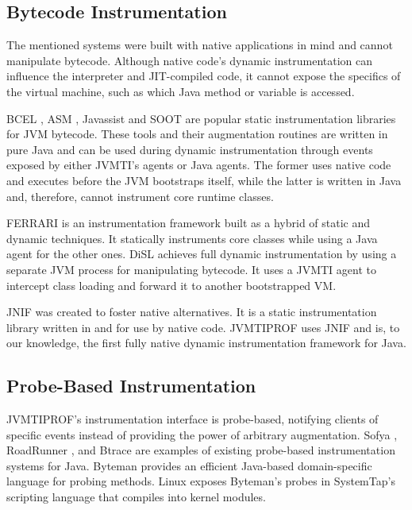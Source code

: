 \subsection{Bytecode Instrumentation}

The mentioned systems were built with native applications in mind and cannot manipulate bytecode. Although native code's dynamic instrumentation can influence the interpreter and JIT-compiled code, it cannot expose the specifics of the virtual machine, such as which Java method or variable is accessed.

BCEL \cite{dahm1999bcel}, ASM \cite{bruneton2002asm}, Javassist \cite{chiba2003javassist} and SOOT \cite{vallee2010soot} are popular static instrumentation libraries for JVM bytecode. These tools and their augmentation routines are written in pure Java and can be used during dynamic instrumentation through events exposed by either JVMTI's agents or Java agents. The former uses native code and executes before the JVM bootstraps itself, while the latter is written in Java and, therefore, cannot instrument core runtime classes.

FERRARI \cite{binder2007ferrari} is an instrumentation framework built as a hybrid of static and dynamic techniques. It statically instruments core classes while using a Java agent for the other ones. DiSL \cite{marek2012disl} achieves full dynamic instrumentation by using a separate JVM process for manipulating bytecode. It uses a JVMTI agent to intercept class loading and forward it to another bootstrapped VM.

JNIF \cite{mastrangelo2014jnif} was created to foster native alternatives. It is a static instrumentation library written in and for use by native code. JVMTIPROF uses JNIF and is, to our knowledge, the first fully native dynamic instrumentation framework for Java.

\subsection{Probe-Based Instrumentation}

JVMTIPROF's instrumentation interface is probe-based, notifying clients of specific events instead of providing the power of arbitrary augmentation. Sofya \cite{kinneer2007sofya}, RoadRunner \cite{flanagan2010roadrunner}, and Btrace \cite{btrace} are examples of existing probe-based instrumentation systems for Java. Byteman \cite{dinn2011byteman} provides an efficient Java-based domain-specific language for probing methods. Linux exposes Byteman's probes in SystemTap's \cite{prasad2005stap} scripting language that compiles into kernel modules.

